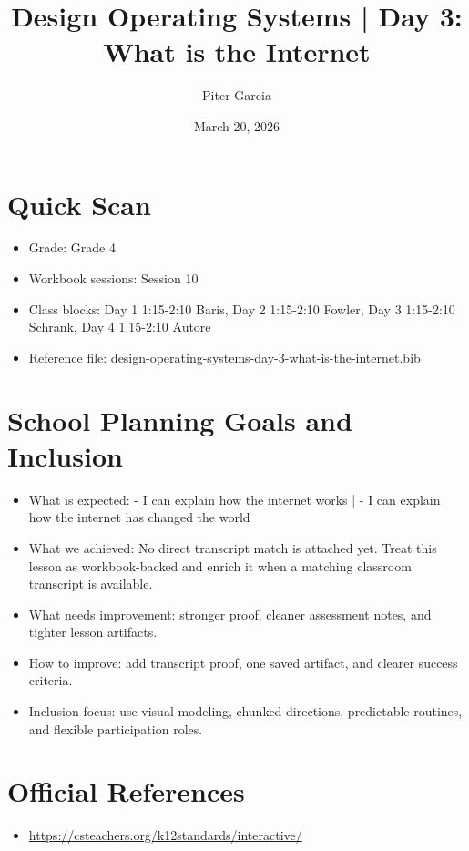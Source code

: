 \documentclass[11pt]{article}
\title{Design Operating Systems | Day 3: What is the Internet}
\author{Piter Garcia}
\date{March 20, 2026}
\begin{document}
\maketitle
\section*{Quick Scan}
\begin{itemize}[leftmargin=*]
\item Grade: Grade 4
\item Workbook sessions: Session 10
\item Class blocks: Day 1 1:15-2:10 Baris, Day 2 1:15-2:10 Fowler, Day 3 1:15-2:10 Schrank, Day 4 1:15-2:10 Autore
\item Reference file: design-operating-systems-day-3-what-is-the-internet.bib
\end{itemize}
\section*{School Planning Goals and Inclusion}
\begin{itemize}[leftmargin=*]
\item What is expected: - I can explain how the internet works | - I can explain how the internet has changed the world
\item What we achieved: No direct transcript match is attached yet. Treat this lesson as workbook-backed and enrich it when a matching classroom transcript is available.
\item What needs improvement: stronger proof, cleaner assessment notes, and tighter lesson artifacts.
\item How to improve: add transcript proof, one saved artifact, and clearer success criteria.
\item Inclusion focus: use visual modeling, chunked directions, predictable routines, and flexible participation roles.
\end{itemize}
\section*{Official References}
\begin{itemize}[leftmargin=*]
\item \url{https://csteachers.org/k12standards/interactive/}

\end{itemize}
\end{document}
